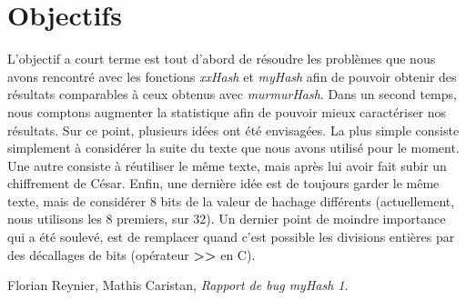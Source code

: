 \documentclass[final,twoside,article,10pt]{scrartcl}
\begin{document}
\section*{Objectifs}
    L'objectif a court terme est tout d'abord de résoudre les problèmes que nous avons rencontré avec les fonctions \textit{xxHash} et \textit{myHash} afin de pouvoir obtenir des résultats comparables à ceux obtenus avec \textit{murmurHash}.
    Dans un second temps, nous comptons augmenter la statistique afin de pouvoir mieux caractériser nos résultats.
    Sur ce point, plusieurs idées ont été envisagées.
    La plus simple consiste simplement à considérer la suite du texte que nous avons utilisé pour le moment. Une autre consiste à réutiliser le même texte, mais après lui avoir fait subir un chiffrement de César. Enfin, une dernière idée est de toujours garder le même texte, mais de considérer 8 bits de la valeur de hachage différents (actuellement, nous utilisons les 8 premiers, sur 32).
    Un dernier point de moindre importance qui a été soulevé, est de remplacer quand c'est possible les divisions entières par des décallages de bits (opérateur \textbf{>{}>} en C).

\begin{thebibliography}{9}
        Florian Reynier, Mathis Caristan, \emph{Rapport de bug \textit{myHash} 1}.
\end{thebibliography}
\end{document}
